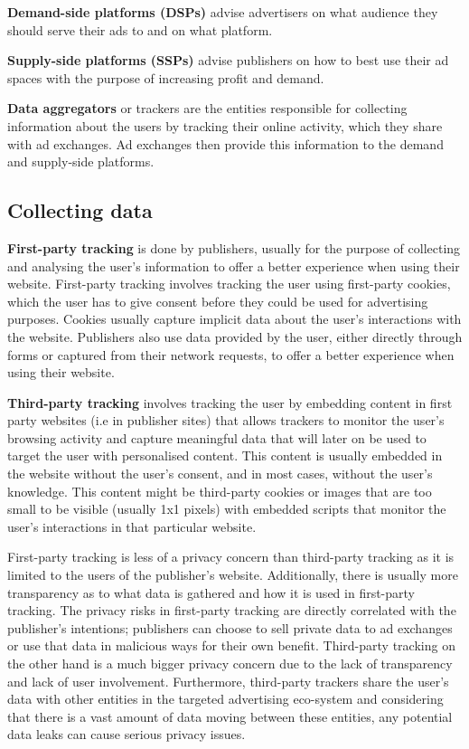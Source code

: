 \documentclass{l4proj}
\begin{document}
\textbf{Demand-side platforms (DSPs)} advise advertisers on what audience they should serve their ads to and on what platform. 

\textbf{Supply-side platforms (SSPs)} advise publishers on how to best use their ad spaces with the purpose of increasing profit and demand. 

\textbf{Data aggregators} or trackers are the entities responsible for collecting information about the users by tracking their online activity, which they share with ad exchanges. Ad exchanges then provide this information to the demand and supply-side platforms.

\subsection{Collecting data}
\textbf{First-party tracking} is done by publishers, usually for the purpose of collecting and analysing the user's information to offer a better experience when using their website. First-party tracking involves tracking the user using first-party cookies, which the user has to give consent before they could be used for advertising purposes. Cookies usually capture implicit data about the user's interactions with the website. Publishers also use data provided by the user, either directly through forms or captured from their network requests, to offer a better experience when using their website.  

\textbf{Third-party tracking} involves tracking the user by embedding content in first party websites (i.e in publisher sites) that allows trackers to monitor the user's browsing activity and capture meaningful data that will later on be used to target the user with personalised content. This content is usually embedded in the website without the user's consent, and in most cases, without the user's knowledge. This content might be third-party cookies or images that are too small to be visible (usually 1x1 pixels) with embedded scripts that monitor the user's interactions in that particular website.

First-party tracking is less of a privacy concern than third-party tracking as it is limited to the users of the publisher's website. Additionally, there is usually more transparency as to what data is gathered and how it is used in first-party tracking. The privacy risks in first-party tracking are directly correlated with the publisher's intentions; publishers can choose to sell private data to ad exchanges or use that data in malicious ways for their own benefit. Third-party tracking on the other hand is a much bigger privacy concern due to the lack of transparency and lack of user involvement. Furthermore, third-party trackers share the user's data with other entities in the targeted advertising eco-system and considering that there is a vast amount of data moving between these entities, any potential data leaks can cause serious privacy issues. 
\end{document}
